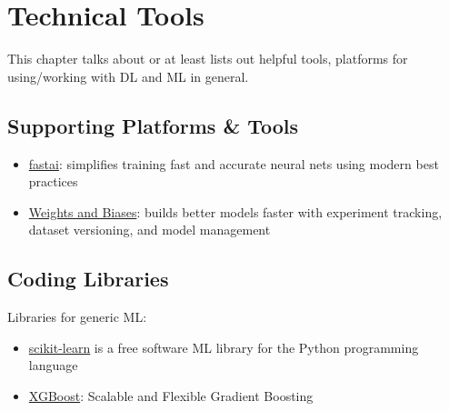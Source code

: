 \chapter{Technical Tools}

This chapter talks about or at least lists out helpful tools, platforms for using/working with \ac{DL} and \ac{ML} in general.

\section{Supporting Platforms \& Tools}
\begin{itemize}
	\item \href{https://github.com/fastai/fastai}{fastai}: simplifies training fast and accurate neural nets using modern best practices
	\item \href{https://wandb.ai/site}{Weights and Biases}: builds better models faster with experiment tracking, dataset versioning, and model management	
\end{itemize}

\section{Coding Libraries}
Libraries for generic \ac{ML}:
\begin{itemize}
	\item \href{https://scikit-learn.org/stable/}{scikit-learn} is a free software \ac{ML} library for the Python programming language
	\item \href{https://xgboost.ai/}{XGBoost}: Scalable and Flexible Gradient Boosting
\end{itemize}

